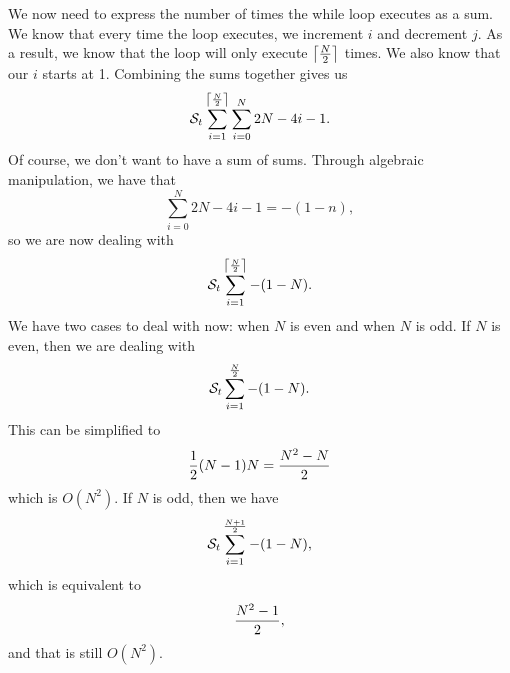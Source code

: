 \documentclass{hw}
\newcommand{\ceil}[1]{\left\lceil #1\right\rceil}
\begin{document}
We now need to express the number of times the while loop executes as a sum. We know that every
time the loop executes, we increment $i$ and decrement $j$. As a result, we know that the loop will
only execute $\ceil{N \over 2}$ times. We also know that our $i$ starts at 1. Combining the sums
together gives us
\[
\mathcal{S}_{t}\sum_{i=1}^{\ceil{N \over 2}}\sum_{i=0}^{N}2N-4i-1.
\]
Of course, we don't want to have a sum of sums. Through algebraic manipulation, we have that
\[
\sum_{i=0}^{N}2N-4i-1 = -(1-n),
\]
so we are now dealing with
\[
\mathcal{S}_{t}\sum_{i=1}^{\ceil{N \over 2}}-(1-N).
\]
We have two cases to deal with now: when $N$ is even and when $N$ is odd. If $N$ is even, then we
are dealing with
\[
\mathcal{S}_{t}\sum_{i=1}^{N \over 2}-(1-N).
\]
This can be simplified to
\[
{1\over2}(N-1)N = {N^{2} - N \over 2}
\]
which is $O(N^{2})$. If $N$ is odd, then we have
\[
\mathcal{S}_{t}\sum_{i=1}^{N + 1 \over 2}-(1-N),
\]
which is equivalent to
\[
{N^{2} - 1 \over 2},
\]
and that is still $O(N^{2})$.
\end{document}
